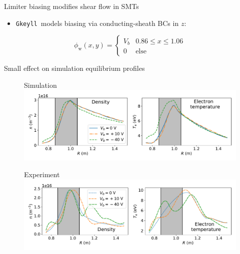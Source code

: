 \documentclass[12pt,table]{beamer}
\newcommand{\gke}{{\tt Gkeyll}}
\begin{document}
\begin{frame}{Limiter biasing modifies shear flow in SMTs}
\begin{minipage}{.5\linewidth}
\vspace{-.5cm}
\begin{itemize} \footnotesize
\item \gke\ models biasing via conducting-sheath BCs in $z$:
\end{itemize}
\footnotesize
    \begin{equation*}
    \label{eq:bc-bias}
    \phi_\mathrm{w}(x,y) = 
    \begin{cases} 
      V_b & 0.86 \leq x \leq 1.06 \\
      0 & \mathrm{else}
    \end{cases}
    \end{equation*}
\end{minipage}
\end{frame}

\begin{frame}{Small effect on simulation equilibrium profiles}
    \begin{figure}
        \centering
        Simulation
        \includegraphics[width=.9\textwidth]{figs/nT-bias-sw.pdf}
        \label{fig:my_label}
    \end{figure}
    \vspace{-.5cm}
    \begin{figure}
        \centering
        Experiment
        \includegraphics[width=.9\textwidth]{figs/nt-exp-sw.pdf}
        \label{fig:my_label}
    \end{figure}
\end{frame}
\end{document}

